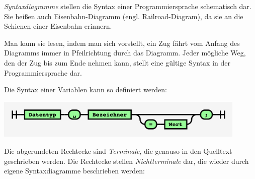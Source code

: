 \documentclass[10pt, a4paper, ngerman]{arbeitsblatt}
\begin{document}
\ReiheTitel

\begin{infobox}
\emph{Syntaxdiagramme} stellen die Syntax einer Programmiersprache schematisch dar. Sie heißen auch Eisenbahn-Diagramm (engl. Railroad-Diagram), da sie an die Schienen einer Eisenbahn erinnern.

Man kann sie lesen, indem man sich vorstellt, ein Zug fährt vom Anfang des Diagramms immer in Pfeilrichtung durch das Diagramm. Jeder mögliche Weg, den der Zug bis zum Ende nehmen kann, stellt eine gültige Syntax in der Programmiersprache dar.
\end{infobox}

Die Syntax einer Variablen kann so definiert werden:
\begin{center}
	\includegraphics[width=12cm]{EF-AB.III.04-RR_Variable.png}
\end{center}

Die abgerundeten Rechtecke sind \emph{Terminale}, die genauso in den Quelltext geschrieben werden. Die Rechtecke stellen \emph{Nichtterminale} dar, die wieder durch eigene Syntaxdiagramme beschrieben werden:
\end{document}
